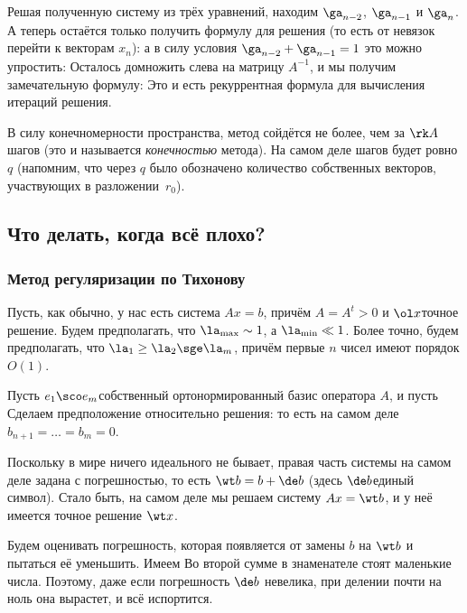 \documentclass[a4paper]{article}
\begin{document}
Решая полученную систему из трёх уравнений, находим $\ga_{n-2}$, $\ga_{n-1}$ и $\ga_n$.
А теперь остаётся только получить формулу для решения (то есть от невязок перейти к векторам $x_n$):
а в силу условия $\ga_{n-2} + \ga_{n-1} = 1$ это можно упростить:
Осталось домножить слева на матрицу $A^{-1}$, и мы получим замечательную формулу:
Это и есть рекуррентная формула для вычисления итераций решения.

В силу конечномерности пространства, метод сойдётся не более, чем за $\rk A$ шагов (это и называется \emph{конечностью} метода).
На самом деле шагов будет ровно $q$ (напомним, что через $q$ было обозначено количество собственных векторов,
участвующих в разложении~$r_0$).

\subsection{Что делать, когда всё плохо?}

\subsubsection{Метод регуляризации по Тихонову}

Пусть, как обычно, у нас есть система $Ax = b$, причём $A = A^t > 0$ и $\ol x$\т точное решение.
Будем предполагать, что $\la_{\max} \sim 1$, а $\la_{\min} \ll 1$. Более точно, будем предполагать,
что $\la_1 \ge \la_2 \sge \la_m$, причём первые $n$ чисел имеют порядок $O(1)$.

Пусть $e_1\sco e_m$\т собственный ортонормированный базис оператора $A$, и пусть
Сделаем предположение относительно решения:
то есть на самом деле $b_{n+1} = \dots = b_m = 0$.

Поскольку в мире ничего идеального не бывает, правая часть системы на самом деле задана с погрешностью,
то есть $\wt b = b + \de b$ (здесь $\de b$\т единый символ). Стало быть, на самом деле мы решаем
систему $Ax = \wt b$, и у неё имеется точное решение $\wt x$.

Будем оценивать погрешность, которая появляется от замены $b$ на $\wt b$ и пытаться её уменьшить.
Имеем
Во второй сумме в знаменателе стоят маленькие числа. Поэтому, даже если погрешность $\de b$ невелика,
при делении почти на ноль она вырастет, и всё испортится.
\end{document}
